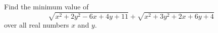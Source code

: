Find the minimum value of
\[
\sqrt{x^2+2y^2-6x+4y+11}+\sqrt{x^2+3y^2+2x+6y+4}
\]
over all real numbers $x$ and $y$.
